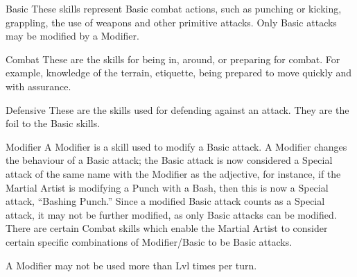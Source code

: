 \documentclass[twoside]{book}
\begin{document}
            
                Basic   These skills represent
                Basic combat actions, such as punching or kicking,
                grappling, the use of weapons and other primitive
                attacks.
               Only Basic attacks may be modified by a Modifier.
               
              
            
                Combat   These are the skills
                for being in, around, or preparing for combat. For
                example, knowledge of the terrain, etiquette, being
                prepared to move quickly and with assurance.
              
            
                Defensive   These are the
                skills used for defending against an attack. They are the
                foil to the Basic skills.
              
            
                Modifier   A Modifier is a
                skill used to modify a Basic attack. A Modifier changes
                the behaviour of a Basic attack; the Basic attack is now
                considered a Special attack of the same name with the
                Modifier as the adjective, for instance, if the Martial
                Artist is modifying a Punch with a Bash, then this is now
                a Special attack, “Bashing Punch.” Since a
                modified Basic attack counts as a Special attack, it may
                not be further modified, as only Basic attacks can be
                modified. There are certain Combat skills which enable
                the Martial Artist to consider certain specific
                combinations of Modifier/Basic to be Basic attacks.
              
           A Modifier may not be used more than Lvl times per
             turn. 
  
\end{document}
